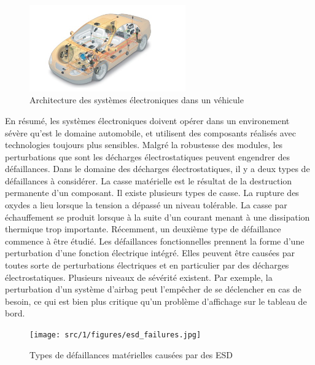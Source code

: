\begin{figure}[!h]
  \centering
  \includegraphics[width=0.6\textwidth]{src/1/figures/systemintegration_01_uv-data.jpg}
  \caption{Architecture des systèmes électroniques dans un véhicule \cite{car-architecture}}
  \label{fig:car-architecture}
\end{figure}

En résumé, les systèmes électroniques doivent opérer dans un environement sévère qu'est le domaine automobile, et utilisent des composants réalisés avec technologies toujours plus sensibles.
Malgré la robustesse des modules, les perturbations que sont les décharges électrostatiques peuvent engendrer des défaillances.
Dans le domaine des décharges électrostatiques, il y a deux types de défaillances à considérer.
La casse matérielle est le résultat de la destruction permanente d'un composant.
Il existe plusieurs types de casse.
La rupture des oxydes a lieu lorsque la tension a dépassé un niveau tolérable.
La casse par échauffement se produit lorsque à la suite d'un courant menant à une dissipation thermique trop importante.
Récemment, un deuxième type de défaillance commence à être étudié.
Les défaillances fonctionnelles prennent la forme d'une perturbation d'une fonction électrique intégré.
Elles peuvent être causées par toutes sorte de perturbations électriques et en particulier par des décharges électrostatiques.
Plusieurs niveaux de sévérité existent.
Par exemple, la perturbation d'un système d'airbag peut l'empêcher de se déclencher en cas de besoin, ce qui est bien plus critique qu'un problème d'affichage sur le tableau de bord.

\begin{figure}[!h]
  \centering
  \texttt{[image: src/1/figures/esd\_failures.jpg]}
  \caption{Types de défaillances matérielles causées par des ESD}
  \label{fig:esd-failures}
\end{figure}

